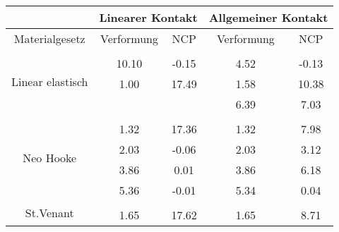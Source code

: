 \begin{table} 
\centering 
\begin{tabular}{c|cc|cc|} 
\cline{2-5} 
 & \multicolumn{2}{|c|}{Linearer Kontakt} & \multicolumn{2}{|c|}{Allgemeiner Kontakt} \\ 
\hline 
\multicolumn{1}{|c|}{Materialgesetz} & \multicolumn{1}{c|}{Verformung} & \multicolumn{1}{c|}{NCP} & \multicolumn{1}{c|}{Verformung} & \multicolumn{1}{c|}{NCP} \\ 
\hline 
\multicolumn{1}{|c|}{\multirow{4}{*}{Linear elastisch}} &\multicolumn{1}{|c|}{} & \multicolumn{1}{|c|}{} & \multicolumn{1}{|c|}{} & \multicolumn{1}{|c|}{} \\ 
\multicolumn{1}{|c|}{} & \multicolumn{1}{|c|}{     10.10} & \multicolumn{1}{|c|}{     -0.15} & \multicolumn{1}{|c|}{      4.52} & \multicolumn{1}{|c|}{     -0.13} \\ 
\multicolumn{1}{|c|}{} & \multicolumn{1}{|c|}{      1.00} & \multicolumn{1}{|c|}{     17.49} & \multicolumn{1}{|c|}{      1.58} & \multicolumn{1}{|c|}{     10.38} \\ 
\multicolumn{1}{|c|}{} & \multicolumn{1}{|c|}{} & \multicolumn{1}{|c|}{} & \multicolumn{1}{|c|}{      6.39} & \multicolumn{1}{|c|}{      7.03} \\ 
\hline 
\multicolumn{1}{|c|}{\multirow{5}{*}{Neo Hooke}} &\multicolumn{1}{|c|}{} & \multicolumn{1}{|c|}{} & \multicolumn{1}{|c|}{} & \multicolumn{1}{|c|}{} \\ 
\multicolumn{1}{|c|}{} & \multicolumn{1}{|c|}{      1.32} & \multicolumn{1}{|c|}{     17.36} & \multicolumn{1}{|c|}{      1.32} & \multicolumn{1}{|c|}{      7.98} \\ 
\multicolumn{1}{|c|}{} & \multicolumn{1}{|c|}{      2.03} & \multicolumn{1}{|c|}{     -0.06} & \multicolumn{1}{|c|}{      2.03} & \multicolumn{1}{|c|}{      3.12} \\ 
\multicolumn{1}{|c|}{} & \multicolumn{1}{|c|}{      3.86} & \multicolumn{1}{|c|}{      0.01} & \multicolumn{1}{|c|}{      3.86} & \multicolumn{1}{|c|}{      6.18} \\ 
\multicolumn{1}{|c|}{} & \multicolumn{1}{|c|}{      5.36} & \multicolumn{1}{|c|}{     -0.01} & \multicolumn{1}{|c|}{      5.34} & \multicolumn{1}{|c|}{      0.04} \\ 
\hline 
\multicolumn{1}{|c|}{\multirow{5}{*}{St.Venant}} &\multicolumn{1}{|c|}{} & \multicolumn{1}{|c|}{} & \multicolumn{1}{|c|}{} & \multicolumn{1}{|c|}{} \\ 
\multicolumn{1}{|c|}{} & \multicolumn{1}{|c|}{      1.65} & \multicolumn{1}{|c|}{     17.62} & \multicolumn{1}{|c|}{      1.65} & \multicolumn{1}{|c|}{      8.71} \\ 

\end{tabular}
\end{table}
